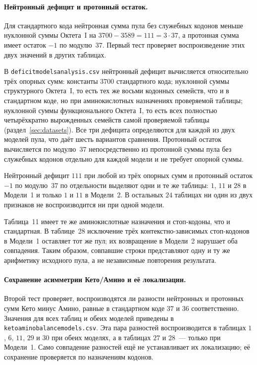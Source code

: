 \documentclass[11pt,a4paper]{article}
\renewcommand{\_}{\origunderscore\allowbreak}
\begin{document}
\paragraph{Нейтронный дефицит и протонный остаток.}
Для стандартного кода нейтронная сумма пула без
служебных кодонов меньше нуклонной суммы Октета~I на
$3700-3589=111=3\cdot37$, а протонная сумма имеет
остаток $-1$ по модулю~$37$. Первый тест проверяет
воспроизведение этих двух значений в других таблицах.

В \texttt{deficit\_models\_analysis.csv} нейтронный
дефицит вычисляется относительно трёх опорных сумм:
константы $3700$ стандартного кода; нуклонной суммы
структурного Октета~I, то есть тех же восьми кодонных
семейств, что и в стандартном коде, но при
аминокислотных назначениях проверяемой таблицы;
нуклонной суммы функционального Октета~I, то есть всех
полностью четырёхкратно вырожденных семейств самой
проверяемой таблицы (раздел~\ref{sec:datasets}).
Все три дефицита определяются для каждой из двух
моделей пула, что даёт шесть вариантов сравнения.
Протонный остаток вычисляется по модулю~$37$
непосредственно из протонной суммы пула без служебных
кодонов отдельно для каждой модели и не требует
опорной суммы.

Нейтронный дефицит $111$ при любой из трёх опорных
сумм и протонный остаток $-1$ по модулю~$37$
по отдельности выделяют одни и те же таблицы:
$1$, $11$ и $28$ в Модели~1 и только $1$ и $11$
в Модели~2. В остальных $24$ таблицах ни один
из двух признаков не воспроизводится ни при одной
модели.

Таблица~11 имеет те же аминокислотные назначения
и стоп-кодоны, что и стандартная. В таблице~28
исключение трёх контекстно-зависимых стоп-кодонов
в Модели~1 оставляет тот же пул; их возвращение
в Модели~2 нарушает оба совпадения. Таким образом,
совпавшие строки представляют одну и ту же
арифметику исходного пула, а не независимые
повторения результата.

\paragraph{Сохранение асимметрии Кето/Амино и её локализации.}
Второй тест проверяет, воспроизводятся ли разности
нейтронных и протонных сумм Кето минус Амино,
равные в стандартном коде $37$ и $36$ соответственно.
Значения для всех таблиц и обеих моделей приведены
в \texttt{keto\_amino\_balance\_models.csv}.
Эта пара разностей воспроизводится в таблицах
$1$, $6$, $11$, $29$ и $30$ при обеих моделях,
а в таблицах $27$ и $28$~--- только при Модели~1.
Само совпадение разностей ещё не устанавливает их
локализацию; её сохранение проверяется по назначениям
кодонов.
\end{document}
